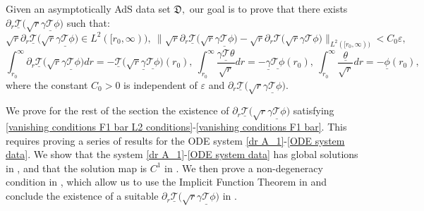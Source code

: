 \documentclass[11pt]{article}
\numberwithin{equation}{section}
\begin{document}
Given an asymptotically AdS data set $\mathfrak{D},$ our goal is to prove that there exists $\partial_r\underline{\mathcal{T}}\big(\sqrt{r}\underline{\gamma\mathcal{T}\phi}\big)$ such that:
\begin{equation}\label{vanishing conditions F1 bar L2 conditions}
    \sqrt{r}\partial_r\underline{\mathcal{T}}\big(\sqrt{r}\underline{\gamma\mathcal{T}\phi}\big)\in L^2([r_0,\infty)),\ \big\|\sqrt{r}\partial_r\underline{\mathcal{T}}\big(\sqrt{r}\underline{\gamma\mathcal{T}\phi}\big)-\sqrt{r}\partial_r\mathcal{T}\big(\sqrt{r}\gamma\mathcal{T\phi}\big)\big\|_{L^2([r_0,\infty))}<C_0\varepsilon,
\end{equation}
\begin{equation}\label{vanishing conditions F1 bar}
    \int_{r_0}^{\infty}\partial_r\underline{\mathcal{T}}\big(\sqrt{r}\underline{\gamma\mathcal{T}\phi}\big)dr=-\underline{\mathcal{T}}\big(\sqrt{r}\underline{\gamma}\underline{\mathcal{T}\phi}\big)(r_0),\ \int_{r_0}^{\infty}\frac{\underline{\gamma \mathcal{T}\theta}}{\sqrt{r}}dr=-\underline{\gamma}\underline{\mathcal{T}\phi}(r_0),\ \int_{r_0}^{\infty}\frac{\underline{\theta}}{\sqrt{r}}dr=-\underline{\phi}(r_0),
\end{equation}
where the constant $C_0>0$ is independent of $\varepsilon$ and $\partial_r\underline{\mathcal{T}}\big(\sqrt{r}\underline{\gamma\mathcal{T}\phi}\big)$.

We prove for the rest of the section the existence of $\partial_r\underline{\mathcal{T}}\big(\sqrt{r}\underline{\gamma\mathcal{T}\phi}\big)$ satisfying \eqref{vanishing conditions F1 bar L2 conditions}-\eqref{vanishing conditions F1 bar}. This requires proving a series of results for the ODE system \eqref{dr A_1}-\eqref{ODE system data}. We show that the system \eqref{dr A_1}-\eqref{ODE system data} has global solutions in , and that the solution map is $C^1$ in . We then prove a non-degeneracy condition in , which allow us to use the Implicit Function Theorem in  and conclude the existence of a suitable $\partial_r\underline{\mathcal{T}}\big(\sqrt{r}\underline{\gamma\mathcal{T}\phi}\big)$ in .
    
\end{document}
